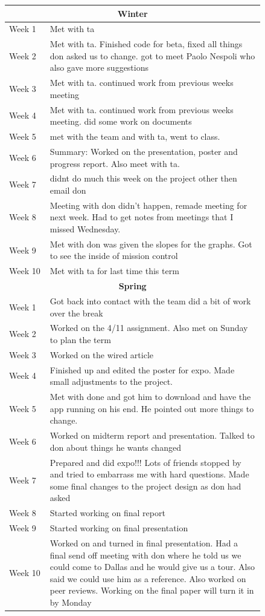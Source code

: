 \documentclass[onecolumn, draftclsnofoot,10pt, compsoc]{IEEEtran}
\begin{document}
\begin{center}
\begin{longtable}{| l | p{0.84\linewidth}|}
    \multicolumn{2}{c}{\textbf{Winter}} \\ \hline
    Week 1 &   Met with ta  \\ \hline
	Week 2 &  Met with ta. Finished code for beta, fixed all things don asked us to change. got to meet Paolo Nespoli who also gave more suggestions \\ \hline
	Week 3 & Met with ta. continued work from previous weeks meeting   \\ \hline
	Week 4 & Met with ta. continued work from previous weeks meeting. did some work on documents \\ \hline
    Week 5 &  met with the team and with ta, went to class.\\ \hline
    Week 6 & Summary: Worked on the presentation, poster and progress report. Also meet with ta.   \\ \hline
	Week 7 & didnt do much this week on the project other then email don \\ \hline
	Week 8 &  Meeting with don didn’t happen, remade meeting for next week. Had to get notes from meetings that I missed Wednesday.  \\ \hline
	Week 9 & Met with don was given the slopes for the graphs. Got to see the inside of mission control  \\ \hline
    Week 10 & Met with ta for last time this term  \\ \hline
    \multicolumn{2}{c}{\textbf{Spring}} \\ \hline
    Week 1 & Got back into contact with the team did a bit of work over the break  \\ \hline
	Week 2 & Worked on the 4/11 assignment. Also met on Sunday to plan the term   \\ \hline
	Week 3 & Worked on the wired article  \\ \hline
	Week 4 &  Finished up and edited the poster for expo. Made small adjustments to the project. \\ \hline
    Week 5 &  Met with done and got him to download and have the app running on his end. He pointed out more things to change.  \\ \hline
    Week 6 & Worked on midterm report and presentation. Talked to don about things he wants changed 

  \\ \hline
	Week 7 &Prepared and did expo!!! Lots of friends stopped by and tried  to embarrass me with hard questions. Made some final changes to the project design as don had asked   \\ \hline
	Week 8 & Started working on final report \\ \hline
	Week 9 & Started working on final presentation \\ \hline
    Week 10 & Worked on and turned in final presentation. Had a final send off meeting with don where he told us we could come to Dallas and he would give us a tour. Also said we could use him as a reference. Also worked on peer reviews. Working on the final paper will turn it in by Monday \\ \hline
\end{longtable}
\end{center}
\end{document}
